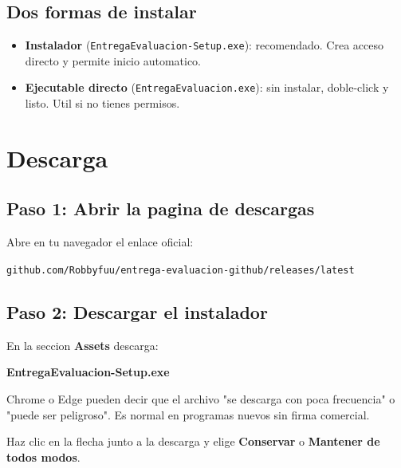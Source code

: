 \documentclass[11pt,a4paper,oneside]{report}
\begin{document}
\section{Dos formas de instalar}

\begin{itemize}
  \item \textbf{Instalador} (\texttt{EntregaEvaluacion-Setup.exe}):
    recomendado. Crea acceso directo y permite inicio automatico.
  \item \textbf{Ejecutable directo} (\texttt{EntregaEvaluacion.exe}):
    sin instalar, doble-click y listo. Util si no tienes permisos.
\end{itemize}

\chapter{Descarga}

\section{Paso 1: Abrir la pagina de descargas}

Abre en tu navegador el enlace oficial:

\begin{center}
\texttt{github.com/Robbyfuu/entrega-evaluacion-github/releases/latest}
\end{center}

\section{Paso 2: Descargar el instalador}

En la seccion \textbf{Assets} descarga:

\begin{center}
\textbf{EntregaEvaluacion-Setup.exe}
\end{center}

\begin{notebox}
Chrome o Edge pueden decir que el archivo "se descarga con poca frecuencia"
o "puede ser peligroso". Es normal en programas nuevos sin firma comercial.

Haz clic en la flecha junto a la descarga y elige \textbf{Conservar} o
\textbf{Mantener de todos modos}.
\end{notebox}

\end{document}
